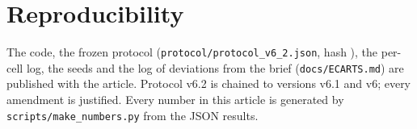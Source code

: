 \section*{Reproducibility}
The code, the frozen protocol (\texttt{protocol/protocol\_v6\_2.json},
hash \ChiffreEmpreinte), the per-cell log, the seeds and the log of
deviations from the brief (\texttt{docs/ECARTS.md}) are published with the
article. Protocol v6.2 is chained to versions v6.1 and v6; every amendment is
justified. Every number in this article is generated by
\texttt{scripts/make\_numbers.py} from the JSON results.
